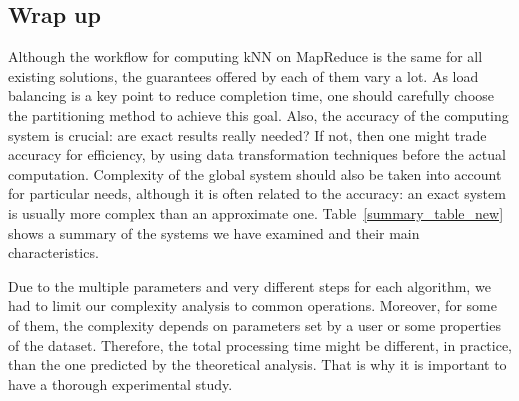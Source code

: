 
\subsection{Wrap up}
Although the workflow for computing kNN on MapReduce is the same for all existing solutions, the guarantees offered by each of them vary a lot. As load 
balancing is a key point to reduce completion time, one should carefully choose the partitioning method to achieve this goal. Also, the accuracy of the 
computing system is crucial: are exact results really needed? If not, then one might trade accuracy for efficiency, by using data transformation 
techniques before the actual computation. 
Complexity of the global system should also be taken into account for particular needs, although it is often related to the accuracy: an exact system is 
usually more complex than an approximate one.
Table~\ref{summary_table_new} shows a summary of the systems we have examined and their main characteristics.

Due to the multiple parameters and very different steps for each algorithm, we had to limit our complexity analysis to 
common operations. Moreover, for some of them, the complexity depends on parameters set by a user or some properties
of the dataset. Therefore, the total processing time might be different, in practice, than the one predicted by the 
theoretical analysis. That is why it is important to have a thorough experimental study.


